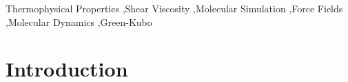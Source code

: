 \documentclass[preprint,review,12pt]{elsarticle}
\begin{document}
\begin{frontmatter}
\begin{abstract}
			
			
			
		\end{abstract}
		
		\begin{keyword}
			
			
			
			Thermophysical Properties \sep Shear Viscosity \sep Molecular Simulation \sep Force Fields \sep Molecular Dynamics \sep Green-Kubo
			
		\end{keyword}
		
	\end{frontmatter}	
	
%	
%	
%	
%	
%	
	
	\section{Introduction}
	
\end{document}
